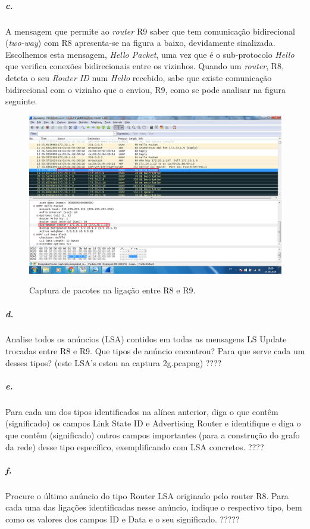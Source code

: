 \subparagraph{c.}
A mensagem que permite ao \emph{router} \textsf{R9} saber que tem comunicação bidirecional (\emph{two-way}) com \textsf{R8} apresenta-se na figura a baixo, devidamente sinalizada. Escolhemos esta mensagem, \emph{Hello Packet}, uma vez que é o sub-protocolo \emph{Hello} que verifica conexões bidirecionais entre os vizinhos. Quando um \emph{router}, \textsf{R8}, deteta o seu \emph{Router ID} num \emph{Hello} recebido, sabe que existe comunicação bidirecional com o vizinho que o enviou, \textsf{R9}, como se pode analisar na figura seguinte.

\begin{figure}[h]
\centering
\includegraphics[width=1\textwidth, height=0.45\textheight]{2c.png}
\label{fig:captura R8-R9}
\caption{Captura de pacotes na ligação entre \textsf{R8} e \textsf{R9}.}
\end{figure}

\subparagraph{d.}

Analise todos os anúncios (LSA) contidos em todas as mensagens LS Update trocadas entre R8 e R9. Que tipos de anúncio encontrou? Para que serve cada um desses tipos?
(este LSA's estou na captura 2g.pcapng) ????

\subparagraph{e.}
Para cada um dos tipos identificados na alínea anterior, diga o que contêm (significado) os campos Link State ID e Advertising Router e identifique e diga o que contêm (significado) outros campos importantes (para a construção do grafo da rede) desse tipo específico, exemplificando com LSA concretos.  ????

\subparagraph{f.}
Procure o último anúncio do tipo Router LSA originado pelo router R8. Para cada uma das ligações identificadas nesse anúncio, indique o respectivo tipo, bem como os valores dos campos ID e Data e o seu significado. ?????

